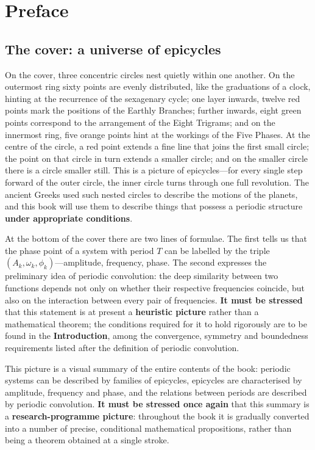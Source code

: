 \chapter*{Preface}

\section*{The cover: a universe of epicycles}

On the cover, three concentric circles nest quietly within one another. On the outermost ring sixty points are evenly distributed, like the graduations of a clock, hinting at the recurrence of the sexagenary cycle; one layer inwards, twelve red points mark the positions of the Earthly Branches; further inwards, eight green points correspond to the arrangement of the Eight Trigrams; and on the innermost ring, five orange points hint at the workings of the Five Phases. At the centre of the circle, a red point extends a fine line that joins the first small circle; the point on that circle in turn extends a smaller circle; and on the smaller circle there is a circle smaller still. This is a picture of epicycles---for every single step forward of the outer circle, the inner circle turns through one full revolution. The ancient Greeks used such nested circles to describe the motions of the planets, and this book will use them to describe things that possess a periodic structure \textbf{under appropriate conditions}.

At the bottom of the cover there are two lines of formulae. The first tells us that the phase point of a system with period $T$ can be labelled by the triple $(A_k, \omega_k, \phi_k)$---amplitude, frequency, phase. The second expresses the preliminary idea of periodic convolution: the deep similarity between two functions depends not only on whether their respective frequencies coincide, but also on the interaction between every pair of frequencies. \textbf{It must be stressed} that this statement is at present a \textbf{heuristic picture} rather than a mathematical theorem; the conditions required for it to hold rigorously are to be found in the \textbf{Introduction}, among the convergence, symmetry and boundedness requirements listed after the definition of periodic convolution.

This picture is a visual summary of the entire contents of the book: periodic systems can be described by families of epicycles, epicycles are characterised by amplitude, frequency and phase, and the relations between periods are described by periodic convolution. \textbf{It must be stressed once again} that this summary is a \textbf{research-programme picture}: throughout the book it is gradually converted into a number of precise, conditional mathematical propositions, rather than being a theorem obtained at a single stroke.


